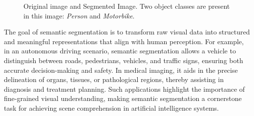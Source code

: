 \begin{figure}[htbp]
    \centering
    \setlength{\tabcolsep}{2pt} %
    \renewcommand{\arraystretch}{0.9}
    \caption{Original image and Segmented Image. Two object classes are present in this image: \textit{Person} and \textit{Motorbike}.}
    \label{fig:semantic_segmentation_example}
\end{figure}

The goal of semantic segmentation is to transform raw visual data into structured and meaningful representations that align with human perception. For example, in an autonomous driving scenario, semantic segmentation allows a vehicle to distinguish between roads, pedestrians, vehicles, and traffic signs, ensuring both accurate decision-making and safety. In medical imaging, it aids in the precise delineation of organs, tissues, or pathological regions, thereby assisting in diagnosis and treatment planning. Such applications highlight the importance of fine-grained visual understanding, making semantic segmentation a cornerstone task for achieving scene comprehension in artificial intelligence systems.

